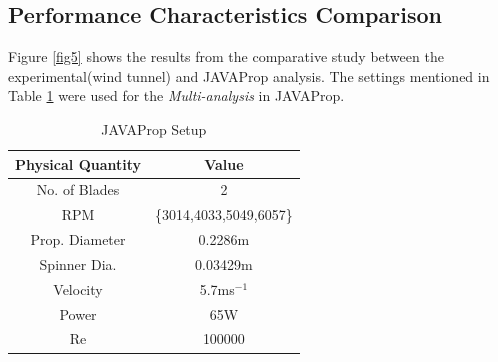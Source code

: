\documentclass[main.tex]{subfiles}
\begin{document}
\vspace{1cm}
\subsection{Performance Characteristics Comparison}
Figure \ref{fig5} shows the results from the comparative study between the experimental(wind tunnel) and JAVAProp analysis. The settings mentioned in Table \ref{table1} were used for the \textit{Multi-analysis} in JAVAProp.

\begin{table}[h!]\begin{center}\begin{tabular}{ c c } 
 \hline \rowcolor{lightgray}
  \hspace{0.5cm}Physical Quantity\hspace{0.5cm} & \hspace{0.5cm}Value\hspace{0.5cm} \\
  \hline
  No. of Blades & 2\\
 \hline
  RPM & \{3014,4033,5049,6057\}\\
 \hline
  Prop. Diameter & 0.2286m\\ 
   \hline
 Spinner Dia. & 0.03429m \\ 
\hline
Velocity & 5.7ms$^{-1}$ \\ 
\hline
Power & 65W \\ 
\hline
Re & 100000 \\ 
\hline
\end{tabular}\caption{JAVAProp Setup}\vspace*{-2em}\label{table1}\end{center}\end{table}
\end{document}
